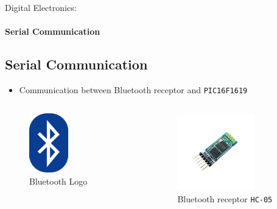 \documentclass{beamer}
\begin{document}
	\begin{frame}{Digital Electronics:}
		\framesubtitle{Serial Communication}
		\subsection[Serial]{Serial Communication}
		\begin{itemize}
		    \item Communication between Bluetooth receptor and \texttt{PIC16F1619}
		\end{itemize}
		\begin{columns}[T]
	  		\begin{column}{0.5\textwidth}
		    	\begin{figure}
		    		\includegraphics[width=0.45\textwidth]{../Illus/BluetoothLogo.png}
	    			\caption{Bluetooth Logo}
	    		 \end{figure}
	  		\end{column}
	  		\begin{column}{0.5\textwidth}
	  			\begin{figure}
	    			\hspace*{2em}\includegraphics[width=0.7\textwidth]{../Illus/HC05.png}
	    			\caption{Bluetooth receptor \texttt{HC-05}}
	    		\end{figure}
	  		\end{column}
	  	\end{columns}
	\end{frame}
\end{document}
